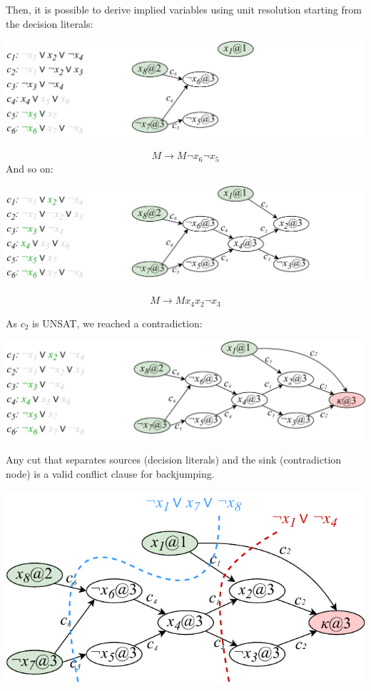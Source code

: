 \begin{description}
\begin{example}
            Then, it is possible to derive implied variables using unit resolution starting from the decision literals:
            \begin{center}
                \includegraphics[width=0.8\linewidth]{./img/_cdcl_example2.pdf}
            \end{center}
            \[ M \rightarrow M \lnot x_6 \lnot x_5 \]
            And so on:
            \begin{center}
                \includegraphics[width=0.8\linewidth]{./img/_cdcl_example3.pdf}
            \end{center}
            \[ M \rightarrow M x_4 x_2 \lnot x_3 \]

            As $c_2$ is UNSAT, we reached a contradiction:
            \begin{center}
                \includegraphics[width=0.8\linewidth]{./img/_cdcl_example4.pdf}
            \end{center}
        \end{example}

    \begin{remark}
        Any cut that separates sources (decision literals) and the sink (contradiction node) is a valid conflict clause for backjumping.

        \indenttbox
        \begin{example} \phantom{}
            \begin{center}
                \includegraphics[width=0.55\linewidth]{./img/_cdcl_cut.pdf}
            \end{center}
        \end{example}
    \end{remark}


\end{description}
